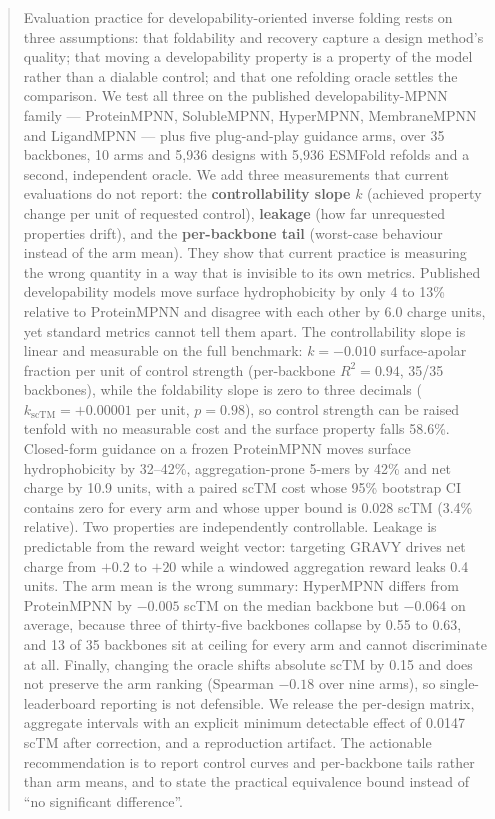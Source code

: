 \begin{abstract}
Evaluation practice for developability-oriented inverse folding rests on three
assumptions: that foldability and recovery capture a design method's quality;
that moving a developability property is a property of the model rather than a
dialable control; and that one refolding oracle settles the comparison. We test
all three on the published developability-MPNN family --- ProteinMPNN,
SolubleMPNN, HyperMPNN, MembraneMPNN and LigandMPNN --- plus five plug-and-play
guidance arms, over 35 backbones, 10 arms and 5,936 designs with 5,936 ESMFold
refolds and a second, independent oracle.
We add three measurements that current evaluations do not report: the
\textbf{controllability slope} $k$ (achieved property change per unit of
requested control), \textbf{leakage} (how far unrequested properties drift), and
the \textbf{per-backbone tail} (worst-case behaviour instead of the arm mean).
They show that current practice is measuring the wrong quantity in a way that is
invisible to its own metrics.
Published developability models move surface hydrophobicity by only 4 to 13\%
relative to ProteinMPNN and disagree with each other by 6.0 charge units, yet
standard metrics cannot tell them apart. The controllability slope is
linear and measurable on the full benchmark: $k = -0.010$ surface-apolar
fraction per unit of control strength (per-backbone $R^2 = 0.94$, 35/35
backbones), while the foldability slope is zero to three decimals
($k_{\mathrm{scTM}} = +0.00001$ per unit, $p = 0.98$), so control strength
can be raised tenfold with no measurable cost and the surface property falls
58.6\%. Closed-form guidance on a frozen
ProteinMPNN moves surface hydrophobicity by 32--42\%, aggregation-prone 5-mers
by 42\% and net charge by 10.9 units, with a paired scTM cost whose 95\%
bootstrap CI contains zero for every arm and whose upper bound is 0.028 scTM
(3.4\% relative). Two properties are independently controllable. Leakage is
predictable from the reward weight vector: targeting GRAVY drives net charge
from $+0.2$ to $+20$ while a windowed aggregation reward leaks 0.4 units. The
arm mean is the wrong summary: HyperMPNN differs from ProteinMPNN by $-0.005$
scTM on the median backbone but $-0.064$ on average, because three of
thirty-five backbones collapse by 0.55 to 0.63, and 13 of 35 backbones sit at
ceiling for every arm and cannot discriminate at all. Finally, changing the
oracle shifts absolute scTM by 0.15 and does not preserve the arm ranking
(Spearman $-0.18$ over nine arms), so single-leaderboard reporting is not
defensible.
We release the per-design matrix, aggregate intervals with an explicit minimum
detectable effect of 0.0147 scTM after correction, and a reproduction artifact.
The actionable recommendation is to report control curves and per-backbone
tails rather than arm means, and to state the practical equivalence bound
instead of ``no significant difference''.
\end{abstract}

